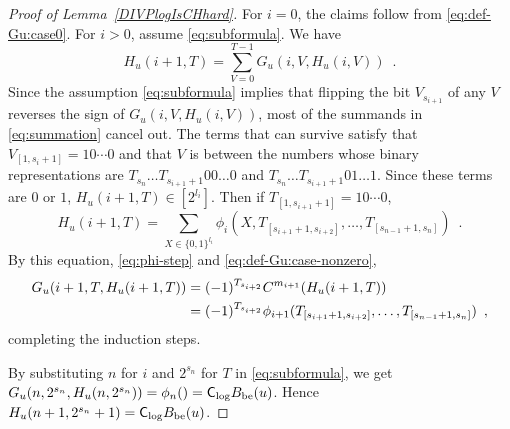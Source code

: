 \begin{proof}[Proof of Lemma~\ref{DIVPlogIsCHhard}]
For $i=0$, the claims follow from \eqref{eq:def-Gu:case0}.
For $i > 0$, assume \eqref{eq:subformula}. 
We have
 \begin{equation} \label{eq:summation}
  H_u(i+1, T) 
  = \sum_{V = 0}^{T-1} G_u(i, V, H_u(i, V)) \enspace .
 \end{equation}
Since the assumption \eqref{eq:subformula} implies that flipping the bit $V_{s_{i+1}}$ of
any $V$ reverses the sign of $G_u(i, V, H_u(i, V))$,
most of the summands in \eqref{eq:summation} cancel out.
The terms that can survive satisfy that $V_{[1, s_i+1]} = 10 \cdots 0$ and
that $V$ is between 
the numbers whose binary representations are
$T_{s_n} \dots T_{s_{i+1}+1} 00 \dots 0$ and 
$T_{s_n} \dots T_{s_{i+1}+1} 01 \dots 1$. 
Since these terms are $0$ or $1$, $H_u(i+1, T) \in [2^{l_i}]$.
Then if $T_{[1,s_{i+1}+1]} = 10 \cdots 0$,
 \begin{equation}
  H_u(i+1, T) = \sum_{X \in \{0,1\}^{l_i}}
  \phi_i(X, T_{[s_{i+1}+1, s_{i+2}]}, \dots, T_{[s_{n-1}+1, s_n]}) \enspace .
 \end{equation}
By this equation, \eqref{eq:phi-step} and \eqref{eq:def-Gu:case-nonzero},
 \begin{align}
  G_u(i+1,T,H_u(i+1,T)) 
  &= (-1)^{T_{s_{i+2}}} C^{m_{i+1}} (H_u(i+1, T)) \notag
  \\
  &= (-1)^{T_{s_{i+2}}} \phi_{i+1}(T_{[s_{i+1}+1, s_{i+2}]}, \dots, T_{[s_{n-1}+1, s_n]}) \enspace ,
\end{align}
completing the induction steps.

By substituting $n$ for $i$ and $2^{s_n}$ for $T$ in \eqref{eq:subformula},
we get $G_u(n, 2^{s_n}, H_u(n,2^{s_n})) = \phi_n() = \mathsf{C}_{\log} B_{\mathrm{be}}(u)$.
Hence $H_u(n+1, 2^{s_n}+1) = \mathsf{C}_{\log} B_{\mathrm{be}}(u)$.
\end{proof}




